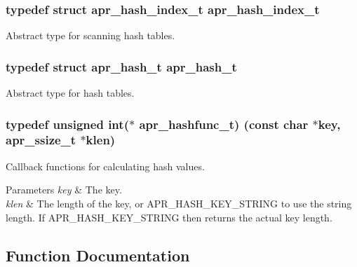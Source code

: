 \subsubsection[{\texorpdfstring{apr\+\_\+hash\+\_\+index\+\_\+t}{apr_hash_index_t}}]{\setlength{\rightskip}{0pt plus 5cm}typedef struct {\bf apr\+\_\+hash\+\_\+index\+\_\+t} {\bf apr\+\_\+hash\+\_\+index\+\_\+t}}\hypertarget{group__apr__hash_ga3b3d353989f6cea4535630634be147f7}{}\label{group__apr__hash_ga3b3d353989f6cea4535630634be147f7}
Abstract type for scanning hash tables. 
\subsubsection[{\texorpdfstring{apr\+\_\+hash\+\_\+t}{apr_hash_t}}]{\setlength{\rightskip}{0pt plus 5cm}typedef struct {\bf apr\+\_\+hash\+\_\+t} {\bf apr\+\_\+hash\+\_\+t}}\hypertarget{group__apr__hash_ga72ec09b8bde6d874c36bd49df915fff6}{}\label{group__apr__hash_ga72ec09b8bde6d874c36bd49df915fff6}
Abstract type for hash tables. 
\subsubsection[{\texorpdfstring{apr\+\_\+hashfunc\+\_\+t}{apr_hashfunc_t}}]{\setlength{\rightskip}{0pt plus 5cm}typedef unsigned {\bf int}($\ast$ apr\+\_\+hashfunc\+\_\+t) (const char $\ast${\bf key}, {\bf apr\+\_\+ssize\+\_\+t} $\ast${\bf klen})}\hypertarget{group__apr__hash_ga0bf5622266af13a2489c907a101cb156}{}\label{group__apr__hash_ga0bf5622266af13a2489c907a101cb156}
Callback functions for calculating hash values. 
\begin{DoxyParams}{Parameters}
{\em key} & The key. \\
\hline
{\em klen} & The length of the key, or A\+P\+R\+\_\+\+H\+A\+S\+H\+\_\+\+K\+E\+Y\+\_\+\+S\+T\+R\+I\+NG to use the string length. If A\+P\+R\+\_\+\+H\+A\+S\+H\+\_\+\+K\+E\+Y\+\_\+\+S\+T\+R\+I\+NG then returns the actual key length. \\
\hline
\end{DoxyParams}


\subsection{Function Documentation}
